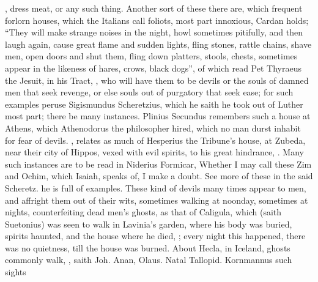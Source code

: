 , dress meat, or any such thing. Another
sort of these there are, which frequent forlorn houses,
which the Italians call foliots, most part innoxious,
Cardan holds; \enquote{They will make strange noises in the night,
howl sometimes pitifully, and then laugh again, cause great flame and sudden
lights, fling stones, rattle chains, shave men, open doors and shut them, fling
down platters, stools, chests, sometimes appear in the likeness of hares,
crows, black dogs}, \etc{} of which read Pet Thyraeus the
Jesuit, in his Tract, , who will have them to be devils or the souls of damned men that seek
revenge, or else souls out of purgatory that seek ease; for such examples
peruse Sigismundus Scheretzius,  which he saith he took out of Luther most part;
there be many instances. Plinius Secundus remembers such a
house at Athens, which Athenodorus the philosopher hired, which no man durst
inhabit for fear of devils. \Austin{},  relates as much of Hesperius the Tribune's house, at Zubeda, near
their city of Hippos, vexed with evil spirits, to his great hindrance, . Many such instances are to be read
in Niderius Formicar,  \etc{}
Whether I may call these Zim and Ochim, which Isaiah,  speaks of, I make a doubt. See more of these in the said Scheretz.
 he is full of examples. These
kind of devils many times appear to men, and affright them out of their wits,
sometimes walking at noonday, sometimes at nights,
counterfeiting dead men's ghosts, as that of Caligula, which (saith Suetonius)
was seen to walk in Lavinia's garden, where his body was buried, spirits
haunted, and the house where he died, ; every night this happened, there
was no quietness, till the house was burned. About Hecla, in Iceland, ghosts
commonly walk, , saith Joh. Anan,
 Olaus.  Natal Tallopid. 
Kornmannus  such sights
